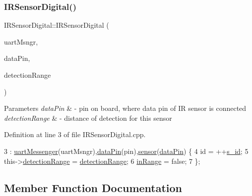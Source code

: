 \subsubsection{\texorpdfstring{I\+R\+Sensor\+Digital()}{IRSensorDigital()}}
{\footnotesize\ttfamily I\+R\+Sensor\+Digital\+::\+I\+R\+Sensor\+Digital (\begin{DoxyParamCaption}\item[{\hyperlink{class_u_a_r_t_messenger}{U\+A\+R\+T\+Messenger} $\ast$const}]{uart\+Msngr,  }\item[{Pin\+Name}]{data\+Pin,  }\item[{float}]{detection\+Range }\end{DoxyParamCaption})}


\begin{DoxyParams}{Parameters}
{\em data\+Pin} & -\/ pin on board, where data pin of IR sensor is connected \\
\hline
{\em detection\+Range} & -\/ distance of detection for this sensor \\
\hline
\end{DoxyParams}


Definition at line 3 of file I\+R\+Sensor\+Digital.\+cpp.


\begin{DoxyCode}
3                                                                                                  :
      \hyperlink{class_i_r_sensor_digital_a4890a7142a916a4d1ef70d7ebbe79f77}{uartMessenger}(uartMsngr),\hyperlink{class_i_r_sensor_digital_a4dcc356ed96053c03b4fd247b9ffc928}{dataPin}(pin),\hyperlink{class_i_r_sensor_digital_a8b0c7fe2d6e9f575d589342648868235}{sensor}(\hyperlink{class_i_r_sensor_digital_a4dcc356ed96053c03b4fd247b9ffc928}{dataPin}) \{
4     \textcolor{keywordtype}{id} = ++\hyperlink{class_abstract_component_a99ce3e5fe7d73dac569b874c15fcaf0d}{s\_id};
5     this->\hyperlink{class_i_r_sensor_digital_abb7c9c63c4aa193dd828d0ee56850478}{detectionRange} = \hyperlink{class_i_r_sensor_digital_abb7c9c63c4aa193dd828d0ee56850478}{detectionRange};
6     \hyperlink{class_i_r_sensor_digital_abeaf8c370c70ac755170a77c92788c57}{inRange} = \textcolor{keyword}{false};
7 \};
\end{DoxyCode}


\subsection{Member Function Documentation}
\mbox{\label{class_abstract_component_ac0b440d1d642ff1292ec3c544d75a8f1}} 
